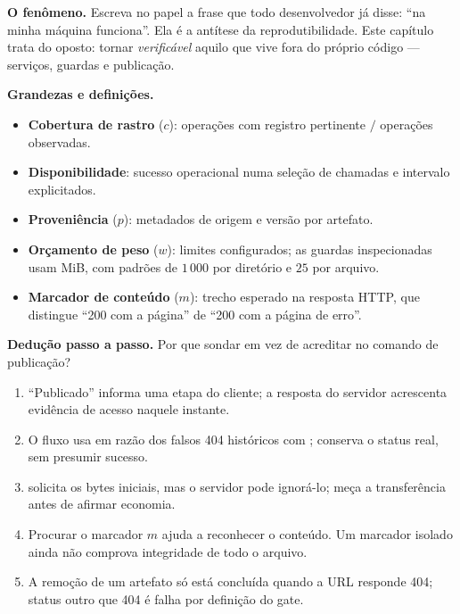 
\begin{descricao}
\textbf{O fenômeno.} Escreva no papel a frase que todo desenvolvedor já disse:
``na minha máquina funciona''. Ela é a antítese da reprodutibilidade. Este
capítulo trata do oposto: tornar \emph{verificável} aquilo que vive fora do
próprio código --- serviços, guardas e publicação.
\end{descricao}

\begin{definicao}
\textbf{Grandezas e definições.}
\begin{itemize}[leftmargin=1.3em,itemsep=1pt]
  \item \textbf{Cobertura de rastro} ($c$): operações com registro pertinente $/$ operações observadas.
  \item \textbf{Disponibilidade}: sucesso operacional numa seleção de chamadas e intervalo explicitados.
  \item \textbf{Proveniência} ($p$): metadados de origem e versão por artefato.
  \item \textbf{Orçamento de peso} ($w$): limites configurados; as guardas inspecionadas usam MiB, com padrões de $1\,000$ por diretório e $25$ por arquivo.
  \item \textbf{Marcador de conteúdo} ($m$): trecho esperado na resposta HTTP, que distingue ``200 com a página'' de ``200 com a página de erro''.
\end{itemize}
\end{definicao}

\begin{metodo}
\textbf{Dedução passo a passo.} Por que sondar em vez de acreditar no comando de
publicação?
\begin{enumerate}[leftmargin=1.4em,itemsep=2pt]
  \item ``Publicado'' informa uma etapa do cliente; a resposta do servidor acrescenta evidência de acesso naquele instante.
  \item O fluxo usa  em razão dos falsos 404 históricos com ; conserva o status real, sem presumir sucesso.
  \item {} solicita os bytes iniciais, mas o servidor pode ignorá-lo; meça a transferência antes de afirmar economia.
  \item Procurar o marcador $m$ ajuda a reconhecer o conteúdo. Um marcador isolado ainda não comprova integridade de todo o arquivo.
  \item A remoção de um artefato só está concluída quando a URL responde 404; status outro que 404 é falha por definição do gate.
\end{enumerate}
\end{metodo}

